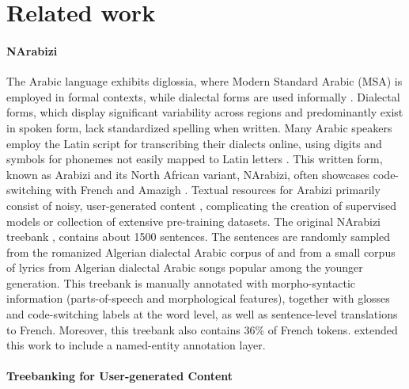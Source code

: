 \documentclass[11pt]{article}
\begin{document}
\section{Related work}
\paragraph{NArabizi}
The Arabic language exhibits diglossia, where Modern Standard Arabic (MSA) is employed in formal contexts, while dialectal forms are used informally \cite{habash10intro}. Dialectal forms, which display significant variability across regions and predominantly exist in spoken form, lack standardized spelling when written. Many Arabic speakers employ the Latin script for transcribing their dialects online, using digits and symbols for phonemes not easily mapped to Latin letters \cite{seddah-etal-2020-building}. This written form, known as Arabizi and its North African variant, NArabizi, often showcases code-switching with French and Amazigh \cite{amazouz2017addressing}. Textual resources for Arabizi primarily consist of noisy, user-generated content \cite{foster-2010-cba,seddah-etal-2012-french,eisenstein2013bad}, complicating the creation of supervised models or collection of extensive pre-training datasets. The original NArabizi treebank  \cite{seddah-etal-2020-building}, contains about 1500 sentences. The sentences are randomly sampled from the romanized Algerian dialectal Arabic corpus of \citet{cotterell2014algerian} and from a small corpus of lyrics from Algerian dialectal Arabic songs popular among the younger generation. This treebank is manually annotated with morpho-syntactic information (parts-of-speech and morphological features), together with glosses and code-switching labels at the word level, as well as sentence-level translations to French. Moreover, this treebank also contains 36\% of French tokens.  extended this work to include a named-entity annotation layer. 



\paragraph{Treebanking for User-generated Content}
\end{document}
